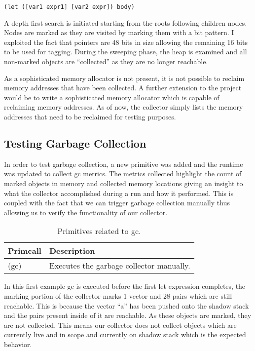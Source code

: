 \documentclass{article}
\begin{document}
\begin{verbatim}
(let ([var1 expr1] [var2 expr]) body)
\end{verbatim}

A depth first search is initiated starting from the roots following children nodes. Nodes are marked as they are visited by marking them with a bit pattern. I exploited the fact that pointers are 48 bits in size allowing the remaining 16 bits to be used for tagging. During the sweeping phase, the heap is examined and all non-marked objects are ``collected'' as they are no longer reachable.

As a sophisticated memory allocator is not present, it is not possible to reclaim memory addresses that have been collected. A further extension to the project would be to write a sophisticated memory allocator which is capable of reclaiming memory addresses. As of now, the collector simply lists the memory addresses that need to be reclaimed for testing purposes.

\subsection{Testing Garbage Collection}

In order to test garbage collection, a new primitive was added and the runtime was updated to collect gc metrics. The metrics collected highlight the count of marked objects in memory and collected memory locations giving an insight to what the collector accomplished during a run and how it performed. This is coupled with the fact that we can trigger garbage collection manually thus allowing us to verify the functionality of our collector.

\begin{table}[ht]
  \centering
\begin{tabular}{ l l }
  \toprule
  Primcall & Description \\ \hline
  \midrule
  (gc) & Executes the garbage collector manually. \\
  \bottomrule
\end{tabular}
\caption{Primitives related to gc.} \label{tab:gc}
\end{table}

In this first example gc is executed before the first let expression completes, the marking portion of the collector marks 1 vector and 28 pairs which are still reachable. This is because the vector ``a'' has been pushed onto the shadow stack and the pairs present inside of it are reachable. As these objects are marked, they are not collected. This means our collector does not collect objects which are currently live and in scope and currently on shadow stack which is the expected behavior.
\end{document}
